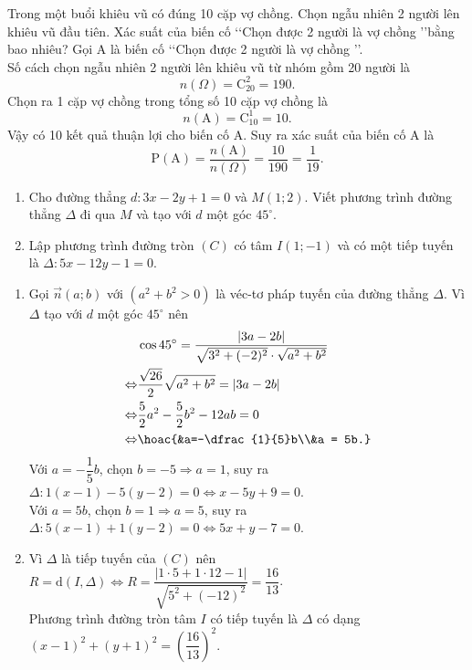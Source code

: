 \begin{bt}%
Trong một buổi khiêu vũ có đúng 10 cặp vợ chồng. Chọn ngẫu nhiên 2 người lên khiêu vũ đầu tiên. Xác suất của biến cố \lq\lq Chọn được 2 người là vợ chồng \rq\rq bằng bao nhiêu?
\loigiai
{
Gọi A là biến cố \lq\lq Chọn được 2 người là vợ chồng \rq\rq.\\
Số cách chọn ngẫu nhiên 2 người lên khiêu vũ từ nhóm gồm 20 người là
\[n\left(\Omega\right) = \mathrm{C}_{20}^2 = 190.\]
Chọn ra 1 cặp vợ chồng trong tổng số 10 cặp vợ chồng là
\[n\left(\mathrm{A}\right) = \mathrm{C}_{10}^1 = 10.\]
Vậy có 10 kết quả thuận lợi cho biến cố A. Suy ra xác suất của biến cố A là
\[\mathrm{P}(\mathrm{A}) = \frac{n\left(\mathrm{A}\right)}{n\left(\Omega\right)} = \frac{10}{190} = \frac{1}{19}.\]
}
\end{bt}

\begin{bt}%
\begin{enumerate}
\item Cho đường thẳng $d\colon3x-2y+1=0$ và $M(1;2)$. Viết phương trình đường thẳng $\Delta$ đi qua $M$ và tạo với $d$ một góc $45^\circ$.
\item Lập phương trình đường tròn $(C)$ có tâm $I(1;-1)$ và có một tiếp tuyến là $\Delta\colon5x-12y-1=0$.
\end{enumerate}
\loigiai
{\begin{enumerate}
\item Gọi $\overrightarrow{n}(a;b)$ với $(a^2+b^2>0)$ là véc-tơ pháp tuyến của đường thẳng $\Delta$.
Vì $\Delta$ tạo với $d$ một góc $45^\circ$ nên 
\begin{align*}
&\cos 45^\circ = \dfrac{|3a-2b|}{\sqrt{3^2+(-2)^2}\cdot\sqrt{a^2+b^2}}\\\Leftrightarrow& \dfrac{\sqrt{26}}{2}\sqrt{a^2+b^2}=|3a-2b|\\\Leftrightarrow&\dfrac{5}{2}a^2-\dfrac{5}{2}b^2-12ab =0\\\Leftrightarrow&\hoac{&a=-\dfrac{1}{5}b\\&a = 5b.}
\end{align*}
Với $a=-\dfrac{1}{5}b$, chọn $b =-5\Rightarrow a = 1$, suy ra $\Delta\colon 1(x-1)-5(y-2)=0\Leftrightarrow x-5y+9=0$.\\
Với $a=5b$, chọn $b =1\Rightarrow a = 5$, suy ra $\Delta\colon 5(x-1)+1(y-2)=0\Leftrightarrow 5x+y-7=0$.\\
\item Vì $\Delta$ là tiếp tuyến của $(C)$ nên $
R = \mathrm{d}(I, \Delta)\Leftrightarrow R = \dfrac{|1\cdot5+1\cdot12-1|}{\sqrt{5^2+(-12)^2}}=\dfrac{16}{13}$.\\
Phương trình đường tròn tâm $I$ có tiếp tuyến là $\Delta$ có dạng $(x-1)^2+(y+1)^2=\left(\dfrac{16}{13}\right)^2$.
\end{enumerate}
}
\end{bt}

